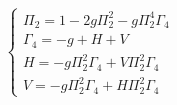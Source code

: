 \begin{equation}
    \left\{\begin{array}{l}
    \Pi_2=1-2g\Pi_2^2-g\Pi_2^4\Gamma_4
    \\
    \Gamma_4=-g+H+V
    \\
    H=-g\Pi_2^2\Gamma_4+V\Pi_2^2\Gamma_4
    \\
    V=-g\Pi_2^2\Gamma_4+H\Pi_2^2\Gamma_4
    \end{array}\right.
\end{equation}

